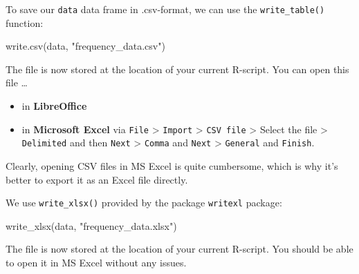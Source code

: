\documentclass[
  11pt,
  letterpaper,
  DIV=11,
  numbers=noendperiod]{scrreprt}
\newenvironment{Shaded}{\begin{snugshade}}{\end{snugshade}}
\newcommand{\FunctionTok}[1]{\textcolor[rgb]{0.28,0.35,0.67}{#1}}
\newcommand{\NormalTok}[1]{\textcolor[rgb]{0.00,0.23,0.31}{#1}}
\newcommand{\StringTok}[1]{\textcolor[rgb]{0.13,0.47,0.30}{#1}}
\begin{document}
\begin{tcolorbox}[enhanced jigsaw, toprule=.15mm, opacitybacktitle=0.6, coltitle=black, arc=.35mm, colback=white, title=\textcolor{quarto-callout-note-color}{\faInfo}\hspace{0.5em}{Export to CSV}, titlerule=0mm, toptitle=1mm, bottomtitle=1mm, breakable, rightrule=.15mm, opacityback=0, bottomrule=.15mm, leftrule=.75mm, colframe=quarto-callout-note-color-frame, left=2mm, colbacktitle=quarto-callout-note-color!10!white]

To save our \texttt{data} data frame in .csv-format, we can use the
\texttt{write\_table()} function:

\begin{Shaded}
\begin{Highlighting}[]
\FunctionTok{write.csv}\NormalTok{(data, }\StringTok{"frequency\_data.csv"}\NormalTok{)}
\end{Highlighting}
\end{Shaded}

The file is now stored at the location of your current R-script. You can
open this file \ldots{}

\begin{itemize}
\item
  in \textbf{LibreOffice}
\item
  in \textbf{Microsoft Excel} via \texttt{File} \textgreater{}
  \texttt{Import} \textgreater{} \texttt{CSV\ file} \textgreater{}
  Select the file \textgreater{} \texttt{Delimited} and then
  \texttt{Next} \textgreater{} \texttt{Comma} and \texttt{Next}
  \textgreater{} \texttt{General} and \texttt{Finish}.
\end{itemize}

Clearly, opening CSV files in MS Excel is quite cumbersome, which is why
it's better to export it as an Excel file directly.

\end{tcolorbox}

\begin{tcolorbox}[enhanced jigsaw, toprule=.15mm, opacitybacktitle=0.6, coltitle=black, arc=.35mm, colback=white, title=\textcolor{quarto-callout-note-color}{\faInfo}\hspace{0.5em}{Export to Excel}, titlerule=0mm, toptitle=1mm, bottomtitle=1mm, breakable, rightrule=.15mm, opacityback=0, bottomrule=.15mm, leftrule=.75mm, colframe=quarto-callout-note-color-frame, left=2mm, colbacktitle=quarto-callout-note-color!10!white]

We use \texttt{write\_xlsx()} provided by the package \texttt{writexl}
package:

\begin{Shaded}
\begin{Highlighting}[]
\FunctionTok{write\_xlsx}\NormalTok{(data, }\StringTok{"frequency\_data.xlsx"}\NormalTok{)}
\end{Highlighting}
\end{Shaded}

The file is now stored at the location of your current R-script. You
should be able to open it in MS Excel without any issues.

\end{tcolorbox}
\end{document}
